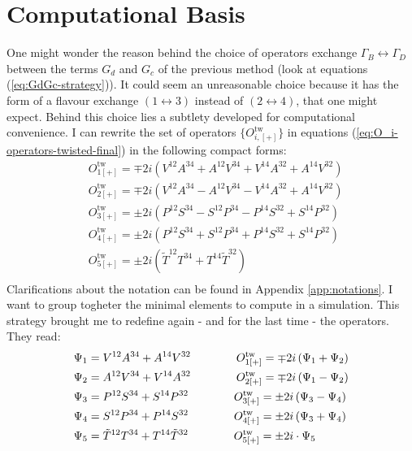 \documentclass[english, LaM, oneside, noexaminfo]{sapthesis}
\begin{document}
\section{Computational Basis}
\noindent
One might wonder the reason behind the choice of operators exchange $\Gamma_B \leftrightarrow \Gamma_D$ between the terms $G_d$ and $G_c$ of the previous method (look at equations (\ref{eq:GdGc-strategy})).
It could seem an unreasonable choice because it has the form of a flavour exchange $(1\leftrightarrow 3)$ instead of $(2\leftrightarrow 4)$, that one might expect.
Behind this choice lies a subtlety developed for computational convenience.
\newline
I can rewrite the set of operators $\{O_{i,[+]}^\text{tw}\}$ in equations (\ref{eq:O_i-operators-twisted-final}) in the following compact forms:
\begin{equation}
    \begin{split}
        & O_{1[+]}^\text{tw} = \mp 2i \left( V^{12}A^{34} + A^{12}V^{34} + V^{14}A^{32} + A^{14}V^{32} \right) \\
        & O_{2[+]}^\text{tw} = \mp 2i \left( V^{12}A^{34} - A^{12}V^{34} - V^{14}A^{32} + A^{14}V^{32} \right) \\
        & O_{3[+]}^\text{tw} = \pm 2i \left( P^{12}S^{34} - S^{12}P^{34} - P^{14}S^{32} + S^{14}P^{32} \right) \\
        & O_{4[+]}^\text{tw} = \pm 2i \left( P^{12}S^{34} + S^{12}P^{34} + P^{14}S^{32} + S^{14}P^{32} \right) \\
        & O_{5[+]}^\text{tw} = \pm 2i \left( \tilde{T}^{12}T^{34} + T^{14}\tilde{T}^{32} \right) \\
    \end{split}
\end{equation}
Clarifications about the notation can be found in Appendix \ref{app:notations}.
I want to group togheter the minimal elements to compute in a simulation.
This strategy brought me to redefine again - and for the last time - the operators.
They read:
\begin{equation*}
    \begin{split}
        & \Psi_{1} =  V^{12}A^{34} + A^{14}V^{32} \hspace*{40pt} O_{1[+]}^\text{tw} = \mp 2i \left( \Psi_{1} + \Psi_{2} \right) \\
        & \Psi_{2} =  A^{12}V^{34} + V^{14}A^{32} \hspace*{40pt} O_{2[+]}^\text{tw} = \mp 2i \left( \Psi_{1} - \Psi_{2} \right) \\
        & \Psi_{3} =  P^{12}S^{34} + S^{14}P^{32} \hspace*{40pt} O_{3[+]}^\text{tw} = \pm 2i \left( \Psi_{3} - \Psi_{4} \right) \\
        & \Psi_{4} =  S^{12}P^{34} + P^{14}S^{32} \hspace*{40pt} O_{4[+]}^\text{tw} = \pm 2i \left( \Psi_{3} + \Psi_{4} \right) \\
        & \Psi_{5} =  \tilde{T}^{12}T^{34} + T^{14}\tilde{T}^{32} \hspace*{40pt} O_{5[+]}^\text{tw} = \pm 2i \cdot \Psi_{5} \\
    \end{split}
\end{equation*}
\end{document}
